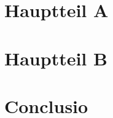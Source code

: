 \documentclass[final,twoside,openright]{book}
\begin{document}
\chapter{Hauptteil A}


\chapter{Hauptteil B}




\chapter{Conclusio}




\cleardoublepage
\appendix
%

\cleardoublepage
\listoffigures
\listoftables
\cleardoublepage
\printglossaries


%
%
\cleardoublepage
\printbibliography
\end{document}
